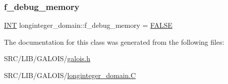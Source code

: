 \mbox{\label{classlonginteger__domain_af85736ae4f9e8a12b164533ab94f5119}} 
\subsubsection{\texorpdfstring{f\+\_\+debug\+\_\+memory}{f\_debug\_memory}}
{\footnotesize\ttfamily \mbox{\hyperlink{galois_8h_a09fddde158a3a20bd2dcadb609de11dc}{I\+NT}} longinteger\+\_\+domain\+::f\+\_\+debug\+\_\+memory = \mbox{\hyperlink{nauty_8h_aa93f0eb578d23995850d61f7d61c55c1}{F\+A\+L\+SE}}\hspace{0.3cm}{\ttfamily [static]}}



The documentation for this class was generated from the following files\+:\begin{DoxyCompactItemize}
\item 
S\+R\+C/\+L\+I\+B/\+G\+A\+L\+O\+I\+S/\mbox{\hyperlink{galois_8h}{galois.\+h}}\item 
S\+R\+C/\+L\+I\+B/\+G\+A\+L\+O\+I\+S/\mbox{\hyperlink{longinteger__domain_8_c}{longinteger\+\_\+domain.\+C}}\end{DoxyCompactItemize}

